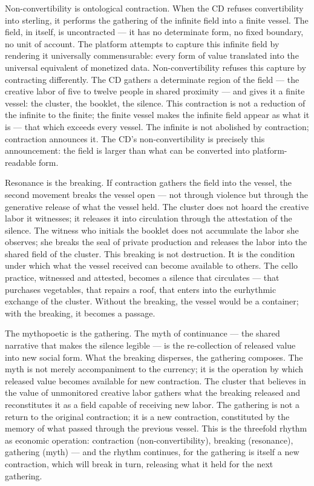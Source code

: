 Non-convertibility is ontological contraction. When the CD refuses convertibility into sterling, it performs the gathering of the infinite field into a finite vessel. The field, in itself, is uncontracted — it has no determinate form, no fixed boundary, no unit of account. The platform attempts to capture this infinite field by rendering it universally commensurable: every form of value translated into the universal equivalent of monetized data. Non-convertibility refuses this capture by contracting differently. The CD gathers a determinate region of the field — the creative labor of five to twelve people in shared proximity — and gives it a finite vessel: the cluster, the booklet, the silence. This contraction is not a reduction of the infinite to the finite; the finite vessel makes the infinite field appear as what it is — that which exceeds every vessel. The infinite is not abolished by contraction; contraction announces it. The CD's non-convertibility is precisely this announcement: the field is larger than what can be converted into platform-readable form.

Resonance is the breaking. If contraction gathers the field into the vessel, the second movement breaks the vessel open — not through violence but through the generative release of what the vessel held. The cluster does not hoard the creative labor it witnesses; it releases it into circulation through the attestation of the silence. The witness who initials the booklet does not accumulate the labor she observes; she breaks the seal of private production and releases the labor into the shared field of the cluster. This breaking is not destruction. It is the condition under which what the vessel received can become available to others. The cello practice, witnessed and attested, becomes a silence that circulates — that purchases vegetables, that repairs a roof, that enters into the eurhythmic exchange of the cluster. Without the breaking, the vessel would be a container; with the breaking, it becomes a passage.

The mythopoetic is the gathering. The myth of continuance — the shared narrative that makes the silence legible — is the re-collection of released value into new social form. What the breaking disperses, the gathering composes. The myth is not merely accompaniment to the currency; it is the operation by which released value becomes available for new contraction. The cluster that believes in the value of unmonitored creative labor gathers what the breaking released and reconstitutes it as a field capable of receiving new labor. The gathering is not a return to the original contraction; it is a new contraction, constituted by the memory of what passed through the previous vessel. This is the threefold rhythm as economic operation: contraction (non-convertibility), breaking (resonance), gathering (myth) — and the rhythm continues, for the gathering is itself a new contraction, which will break in turn, releasing what it held for the next gathering.

